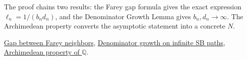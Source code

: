\begin{remark*}
The proof chains two results: the Farey gap formula gives the exact
expression $\ell_n = 1/(b_n d_n)$, and the Denominator Growth Lemma
gives $b_n, d_n \to \infty$.  The Archimedean property converts the
asymptotic statement into a concrete $N$.
\end{remark*}

\begin{dependencies}
\hyperref[thm:farey-gap]{Gap between Farey neighbors},
\hyperref[lem:sb-denom-growth]{Denominator growth on infinite SB paths},
\hyperref[thm:archimedean-q]{Archimedean property of $\mathbb{Q}$}.
\end{dependencies}

\clearpage
